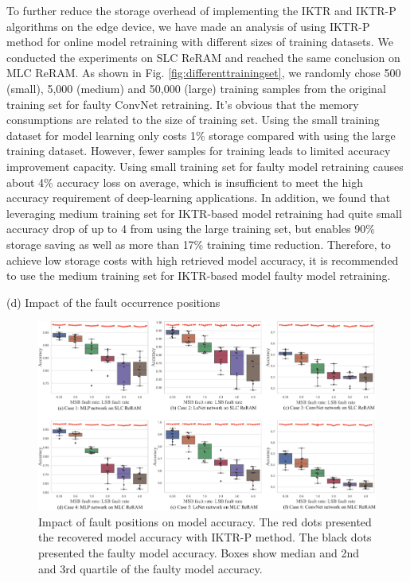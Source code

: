To further reduce the storage overhead of implementing the IKTR and IKTR-P algorithms on the edge device, we have made an analysis of using IKTR-P method for online model retraining with different sizes of training datasets. We conducted the experiments on SLC ReRAM and reached the same conclusion on MLC ReRAM. As shown in Fig. \ref{fig:differenttrainingset}, we randomly chose 500 (small), 5,000 (medium) and 50,000 (large) training samples from the original training set for faulty ConvNet retraining. It’s obvious that the memory consumptions are related to the size of training set. Using the small training dataset for model learning only costs {1\%} storage compared with using the large training dataset. However, fewer samples for training leads to limited accuracy improvement capacity. Using small training set for faulty model retraining causes about {4\%} accuracy loss on average, which is insufficient to meet the high accuracy requirement of deep-learning applications. In addition, we found that leveraging medium training set for  IKTR-based model retraining had quite small accuracy drop of up to {4\textperthousand} from using the large training set, but enables {90\%} storage saving as well as more than {17\%} training time reduction. %
Therefore, to achieve low storage costs with high retrieved model accuracy, it is recommended to use the medium training set for IKTR-based model faulty model retraining.


(d) Impact of the fault occurrence positions

\begin{figure}
    \centering
    \includegraphics[width=0.85\linewidth]{images/OL-fig18}
    \caption{Impact of fault positions on model accuracy. The red dots presented the recovered model accuracy with IKTR-P method. The black dots presented the faulty model accuracy. Boxes show median and 2nd and 3rd quartile of the faulty model accuracy.}
    \label{fig:proportionalfaultinjectresult}
    \vspace{-10pt}
\end{figure}

